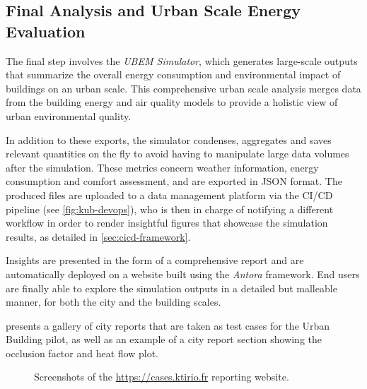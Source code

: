 \documentclass[runningheads]{llncs}
\begin{document}
\subsection{Final Analysis and Urban Scale Energy Evaluation}
\label{sec:final-analysis}

The final step involves the \textit{UBEM Simulator}, which generates large-scale outputs that summarize the overall energy consumption and environmental impact of buildings on an urban scale. This comprehensive urban scale analysis merges data from the building energy and air quality models to provide a holistic view of urban environmental quality.

In addition to these exports, the simulator condenses, aggregates and saves relevant quantities on the fly to avoid having to manipulate large data volumes after the simulation. These metrics concern weather information, energy consumption and comfort assessment, and are exported in JSON format. The produced files are uploaded to a data management platform via the CI/CD pipeline (see \cref{fig:kub-devops}), who is then in charge of notifying a different workflow in order to render insightful figures that showcase the simulation results, as detailed in \cref{sec:cicd-framework}.

Insights are presented in the form of a comprehensive report and are automatically deployed on a website built using the \textit{Antora} framework. End users are finally able to explore the simulation outputs in a detailed but malleable manner, for both the city and the building scales.

 presents a gallery of city reports that are taken as test cases for the Urban Building pilot, as well as an example of a city report section showing the occlusion factor and heat flow plot.
\begin{figure}[htbp]
  \centering
  \hfill
  \caption{Screenshots of the \url{https://cases.ktirio.fr} reporting website.}
  \label{fig:ktirio-cases-report}
\end{figure}
\end{document}

